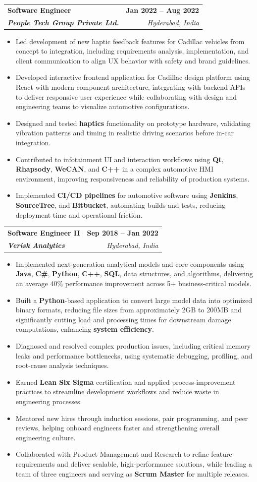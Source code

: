 \documentclass[letterpaper,11pt]{article}
\makeatletter
\newcommand{\resumeItem}[1]{
  \item\small{
    {#1 \vspace{-2pt}}
  }
}
\newcommand{\resumeSubheading}[4]{
  \vspace{-2pt}\item
    \begin{tabular*}{1.0\textwidth}[t]{l@{\extracolsep{\fill}}r}
      \textbf{#1} & \textbf{\small #2} \\
      \textit{\small#3} & \textit{\small #4} \\
    \end{tabular*}\vspace{-7pt}
}
\newcommand{\resumeItemListStart}{\begin{itemize}}
\newcommand{\resumeItemListEnd}{\end{itemize}\vspace{-5pt}}
\makeatother
\begin{document}
    \resumeSubheading
      {\textbf{Software Engineer}}{\textbf{Jan 2022 -- Aug 2022}}
      {\textbf{People Tech Group Private Ltd.}}{Hyderabad, India}
      \resumeItemListStart
        \resumeItem{Led development of new haptic feedback features for Cadillac vehicles from concept to integration, including requirements analysis, implementation, and client communication to align UX behavior with safety and brand guidelines.}
        \resumeItem{Developed interactive frontend application for Cadillac design platform using React with modern component architecture, integrating with backend APIs to deliver responsive user experience while collaborating with design and engineering teams to visualize automotive configurations.}
        \resumeItem{Designed and tested \textbf{haptics} functionality on prototype hardware, validating vibration patterns and timing in realistic driving scenarios before in-car integration.}
        \resumeItem{Contributed to infotainment UI and interaction workflows using \textbf{Qt}, \textbf{Rhapsody}, \textbf{WeCAN}, and \textbf{C++} in a complex automotive HMI environment, improving responsiveness and reliability of production systems.}
        \resumeItem{Implemented \textbf{CI/CD pipelines} for automotive software using \textbf{Jenkins}, \textbf{SourceTree}, and \textbf{Bitbucket}, automating builds and tests, reducing deployment time and operational friction.}
      \resumeItemListEnd

    \resumeSubheading
      {\textbf{Software Engineer II}}{\textbf{Sep 2018 -- Jan 2022}}
      {\textbf{Verisk Analytics}}{Hyderabad, India}
      \resumeItemListStart
        \resumeItem{Implemented next-generation analytical models and core components using \textbf{Java}, \textbf{C\#}, \textbf{Python}, \textbf{C++}, \textbf{SQL}, data structures, and algorithms, delivering an average 40\% performance improvement across 5+ business-critical models.}
        \resumeItem{Built a \textbf{Python}-based application to convert large model data into optimized binary formats, reducing file sizes from approximately 2GB to 200MB and significantly cutting load and processing times for downstream damage computations, enhancing \textbf{system efficiency}.}
        \resumeItem{Diagnosed and resolved complex production issues, including critical memory leaks and performance bottlenecks, using systematic debugging, profiling, and root-cause analysis techniques.}
        \resumeItem{Earned \textbf{Lean Six Sigma} certification and applied process-improvement practices to streamline development workflows and reduce waste in engineering processes.}
        \resumeItem{Mentored new hires through induction sessions, pair programming, and peer reviews, helping onboard engineers faster and strengthening overall engineering culture.}
        \resumeItem{Collaborated with Product Management and Research to refine feature requirements and deliver scalable, high-performance solutions, while leading a team of three engineers and serving as \textbf{Scrum Master} for multiple releases.}
      \resumeItemListEnd
\end{document}
